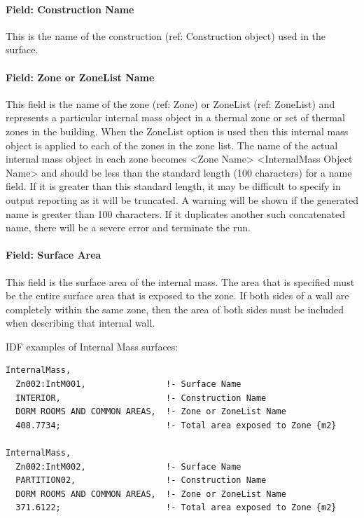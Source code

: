 \paragraph{Field: Construction Name}\label{field-construction-name-21}

This is the name of the construction (ref: Construction object) used in the surface.

\paragraph{Field: Zone or ZoneList Name}\label{field-zone-or-zonelist-name-14}

This field is the name of the zone (ref: Zone) or ZoneList (ref: ZoneList) and represents a particular internal mass object in a thermal zone or set of thermal zones in the building. When the ZoneList option is used then this internal mass object is applied to each of the zones in the zone list. The name of the actual internal mass object in each zone becomes <Zone Name> <InternalMass Object Name> and should be less than the standard length (100 characters) for a name field. If it is greater than this standard length, it may be difficult to specify in output reporting as it will be truncated. A warning will be shown if the generated name is greater than 100 characters. If it duplicates another such concatenated name, there will be a severe error and terminate the run.

\paragraph{Field: Surface Area}\label{field-surface-area}

This field is the surface area of the internal mass. The area that is specified must be the entire surface area that is exposed to the zone. If both sides of a wall are completely within the same zone, then the area of both sides must be included when describing that internal wall.

IDF examples of Internal Mass surfaces:

\begin{lstlisting}
InternalMass,
  Zn002:IntM001,                !- Surface Name
  INTERIOR,                     !- Construction Name
  DORM ROOMS AND COMMON AREAS,  !- Zone or ZoneList Name
  408.7734;                     !- Total area exposed to Zone {m2}

InternalMass,
  Zn002:IntM002,                !- Surface Name
  PARTITION02,                  !- Construction Name
  DORM ROOMS AND COMMON AREAS,  !- Zone or ZoneList Name
  371.6122;                     !- Total area exposed to Zone {m2}
\end{lstlisting}

